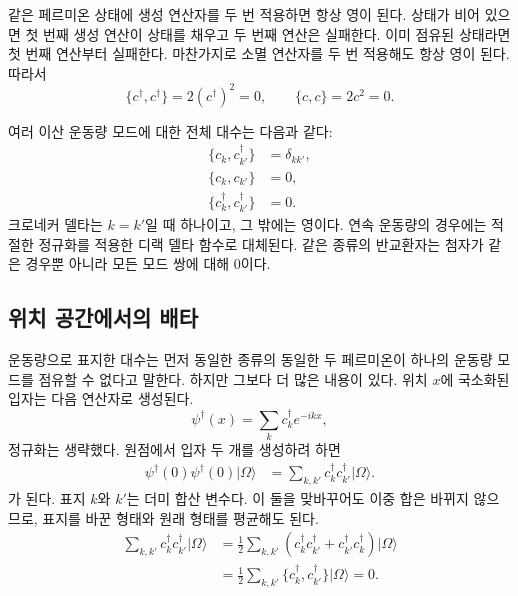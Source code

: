 같은 페르미온 상태에 생성 연산자를 두 번 적용하면 항상 영이 된다. 상태가 비어 있으면 첫 번째 생성 연산이 상태를 채우고 두 번째 연산은 실패한다. 이미 점유된 상태라면 첫 번째 연산부터 실패한다. 마찬가지로 소멸 연산자를 두 번 적용해도 항상 영이 된다. 따라서
\begin{equation}
\{c^\dagger,c^\dagger\}=2(c^\dagger)^2=0,
\qquad
\{c,c\}=2c^2=0.
\end{equation}

\begin{classroomqa}
\end{classroomqa}

여러 이산 운동량 모드에 대한 전체 대수는 다음과 같다:
\begin{align}
\{c_k,c_{k'}^\dagger\}&=\delta_{kk'},
\\
\{c_k,c_{k'}\}&=0,
\\
\{c_k^\dagger,c_{k'}^\dagger\}&=0.
\end{align}
크로네커 델타는 \(k=k'\)일 때 하나이고, 그 밖에는 영이다. 연속 운동량의 경우에는 적절한 정규화를 적용한 디랙 델타 함수로 대체된다. 같은 종류의 반교환자는 첨자가 같은 경우뿐 아니라 모든 모드 쌍에 대해 0이다.

\subsection{위치 공간에서의 배타}

운동량으로 표지한 대수는 먼저 동일한 종류의 동일한 두 페르미온이 하나의 운동량 모드를 점유할 수 없다고 말한다. 하지만 그보다 더 많은 내용이 있다. 위치 \(x\)에 국소화된 입자는 다음 연산자로 생성된다.
\begin{equation}
\psi^\dagger(x)=\sum_k c_k^\dagger e^{-ikx},
\end{equation}
정규화는 생략했다. 원점에서 입자 두 개를 생성하려 하면
\begin{align}
\psi^\dagger(0)\psi^\dagger(0)|\Omega\rangle
&=\sum_{k,k'}c_k^\dagger c_{k'}^\dagger|\Omega\rangle.
\end{align}
가 된다. 표지 \(k\)와 \(k'\)는 더미 합산 변수다. 이 둘을 맞바꾸어도 이중 합은 바뀌지 않으므로, 표지를 바꾼 형태와 원래 형태를 평균해도 된다.
\begin{align}
\sum_{k,k'}c_k^\dagger c_{k'}^\dagger|\Omega\rangle
&=\frac12\sum_{k,k'}
\left(c_k^\dagger c_{k'}^\dagger
+c_{k'}^\dagger c_k^\dagger\right)|\Omega\rangle
\\
&=\frac12\sum_{k,k'}
\{c_k^\dagger,c_{k'}^\dagger\}|\Omega\rangle
=0.
\end{align}

